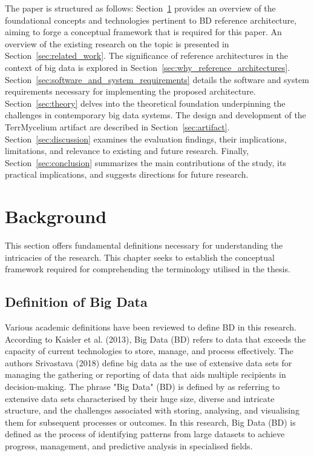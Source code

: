 \documentclass[preprint,12pt]{elsarticle}
\begin{document}
The paper is structured as follows: Section~\ref{sec:background} provides an overview of the foundational concepts and technologies pertinent to BD reference architecture, aiming to forge a conceptual framework that is required for this paper. An overview of the existing research on the topic is presented in Section~\ref{sec:related_work}. The significance of reference architectures in the context of big data is explored in Section~\ref{sec:why_reference_architectures}. Section~\ref{sec:software_and_system_requirements} details the software and system requirements necessary for implementing the proposed architecture. Section~\ref{sec:theory} delves into the theoretical foundation underpinning the challenges in contemporary big data systems. The design and development of the TerrMycelium artifact are described in Section~\ref{sec:artifact}. Section~\ref{sec:discussion} examines the evaluation findings, their implications, limitations, and relevance to existing and future research. Finally, Section~\ref{sec:conclusion} summarizes the main contributions of the study, its practical implications, and suggests directions for future research.


\section{Background} \label{sec:background} 

This section offers fundamental definitions necessary for understanding the intricacies of the research. This chapter seeks to establish the conceptual framework required for comprehending the terminology utilised in the thesis. 

\subsection{Definition of Big Data} Various academic definitions have been reviewed to define BD in this research. According to Kaisler et al. (2013), Big Data (BD) refers to data that exceeds the capacity of current technologies to store, manage, and process effectively. The authors Srivastava (2018) define big data as the use of extensive data sets for managing the gathering or reporting of data that aids multiple recipients in decision-making. The phrase "Big Data" (BD) is defined by \citet{Sagiroglu2013} as referring to extensive data sets characterised by their huge size, diverse and intricate structure, and the challenges associated with storing, analysing, and visualising them for subsequent processes or outcomes. In this research, Big Data (BD) is defined as the process of identifying patterns from large datasets to achieve progress, management, and predictive analysis in specialised fields. 
\end{document}
